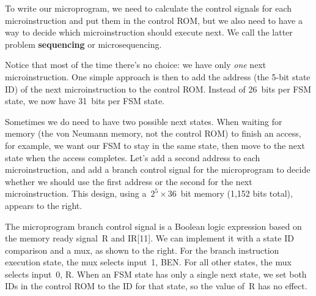\begin{minipage}{4.25in}
To write our microprogram, we need to calculate the control signals
for each microinstruction and put them in the control ROM, but we also
need to have a way to decide which microinstruction should execute 
next.  We call the latter problem {\bf sequencing} or microsequencing.\mpline

Notice that most of the time there's no choice: we have only {\em one}
next microinstruction.  One simple approach is then to add the address
(the \mbox{5-bit} state ID) of the next microinstruction to the control ROM.
Instead of 26~bits per FSM state, we now have 31~bits per FSM state.\mpline

Sometimes we do need to have two possible next states.  When waiting
for memory (the von Neumann memory, not the control ROM) to
finish an access, for example, we want our FSM to stay
in the same state, then move to the next state when the access completes.
Let's add a second address to each microinstruction, and add
a branch control signal for the microprogram to decide whether we
should use the first address or the second for the next
microinstruction.  This design, using a~$2^5\times{36}$~bit memory
(1,152 bits total), appears to the right.
\end{minipage}\hspace{0.25in}%
\begin{minipage}{2in}
\end{minipage}

\begin{minipage}{3.95in}
The microprogram branch control signal is a Boolean logic expression
based on the memory ready signal~R and 
IR[11].  We can implement it with a state ID comparison and
a mux, as shown to the right.  For the branch instruction execution state, 
the mux selects input~1, BEN.  For all other states, the mux selects 
input~0, R.  When an FSM state has only a single next state, we set both 
IDs in the control ROM to the ID for that state, so the value of~R 
has no effect.
\end{minipage}\hspace{0.25in}%
\begin{minipage}{2.3in}
\\
\end{minipage}


